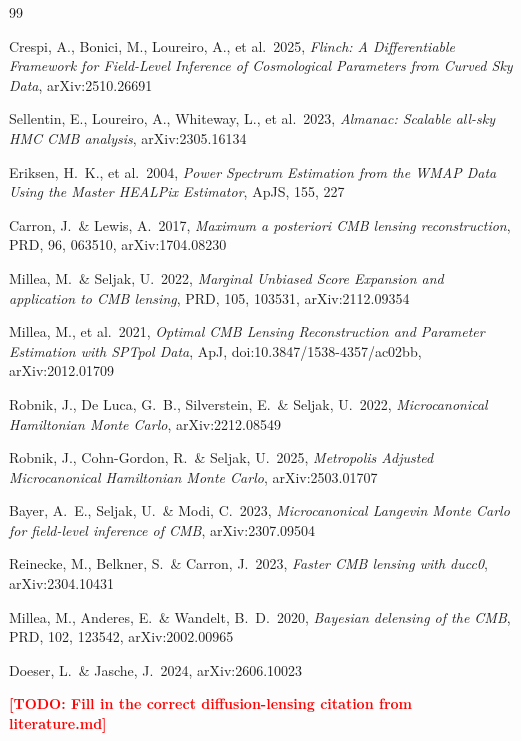 \documentclass[twocolumn,superscriptaddress,aps,prl,floatfix]{revtex4-2}
\newcommand{\todo}[1]{\textcolor{red}{\textbf{[TODO: #1]}}}
\begin{document}
\begin{thebibliography}{99}

Crespi, A., Bonici, M., Loureiro, A., et al.\ 2025,
\textit{Flinch: A Differentiable Framework for Field-Level Inference of Cosmological Parameters from Curved Sky Data},
arXiv:2510.26691

Sellentin, E., Loureiro, A., Whiteway, L., et al.\ 2023,
\textit{Almanac: Scalable all-sky HMC CMB analysis},
arXiv:2305.16134

Eriksen, H.\ K., et al.\ 2004,
\textit{Power Spectrum Estimation from the WMAP Data Using the Master HEALPix Estimator},
ApJS, 155, 227

Carron, J.\ \& Lewis, A.\ 2017,
\textit{Maximum a posteriori CMB lensing reconstruction},
PRD, 96, 063510,
arXiv:1704.08230

Millea, M.\ \& Seljak, U.\ 2022,
\textit{Marginal Unbiased Score Expansion and application to CMB lensing},
PRD, 105, 103531,
arXiv:2112.09354

Millea, M., et al.\ 2021,
\textit{Optimal CMB Lensing Reconstruction and Parameter Estimation with SPTpol Data},
ApJ, doi:10.3847/1538-4357/ac02bb,
arXiv:2012.01709

Robnik, J., De Luca, G.\ B., Silverstein, E.\ \& Seljak, U.\ 2022,
\textit{Microcanonical Hamiltonian Monte Carlo},
arXiv:2212.08549

Robnik, J., Cohn-Gordon, R.\ \& Seljak, U.\ 2025,
\textit{Metropolis Adjusted Microcanonical Hamiltonian Monte Carlo},
arXiv:2503.01707

Bayer, A.\ E., Seljak, U.\ \& Modi, C.\ 2023,
\textit{Microcanonical Langevin Monte Carlo for field-level inference of CMB},
arXiv:2307.09504

Reinecke, M., Belkner, S.\ \& Carron, J.\ 2023,
\textit{Faster CMB lensing with ducc0},
arXiv:2304.10431

Millea, M., Anderes, E.\ \& Wandelt, B.\ D.\ 2020,
\textit{Bayesian delensing of the CMB},
PRD, 102, 123542,
arXiv:2002.00965

Doeser, L.\ \& Jasche, J.\ 2024,
arXiv:2606.10023

\todo{Fill in the correct diffusion-lensing citation from literature.md}

\end{thebibliography}
\end{document}

